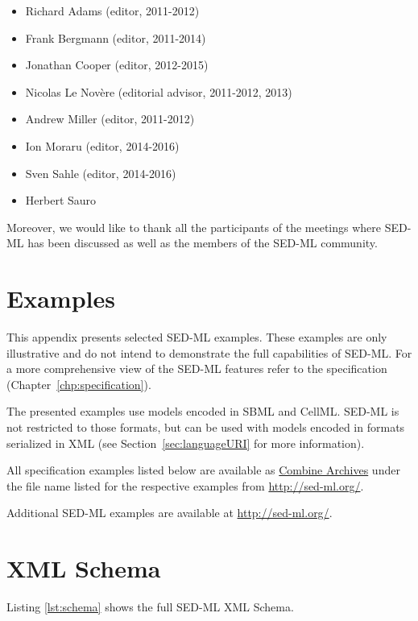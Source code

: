 \documentclass[pdftex,rgb,dvipsnames,svgnames,hyperref,table]{report}
\begin{document}
\begin{itemize}
\item Richard Adams (editor, 2011-2012)
\item Frank Bergmann (editor, 2011-2014)
\item Jonathan Cooper (editor, 2012-2015)
\item Nicolas Le Novère (editorial advisor, 2011-2012, 2013)
\item Andrew Miller (editor, 2011-2012)
\item Ion Moraru (editor, 2014-2016)
\item Sven Sahle (editor, 2014-2016)
\item Herbert Sauro
\end{itemize}

Moreover, we would like to thank all the participants of the meetings where SED-ML has been discussed as well as the members of the SED-ML community.


\appendix

\chapter{Examples}
\label{app:examples}
This appendix presents selected SED-ML examples. These examples are only illustrative and do not intend to demonstrate the full capabilities of SED-ML. For a more comprehensive view of the SED-ML features refer to the specification (Chapter~\ref{chp:specification}). 

The presented examples use models encoded in SBML and CellML. SED-ML is not restricted to those formats, but can be used with models encoded in formats serialized in XML (see Section~\ref{sec:languageURI} for more information).

All specification examples listed below are available as \hyperref[sec:archive]{Combine Archives} under the  file name listed for the respective examples from \url{http://sed-ml.org/}. 

Additional SED-ML examples are available at \url{http://sed-ml.org/}.




\chapter{XML Schema}
\label{app:schema}
Listing \ref{lst:schema} shows the full SED-ML XML Schema.



\end{document}
